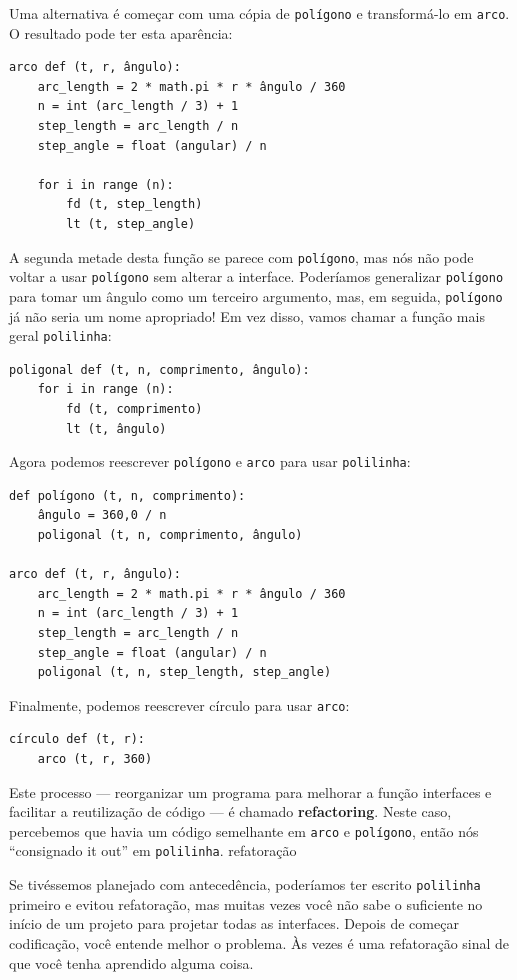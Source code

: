 \documentclass[10pt]{book}
\begin{document}
\begin{exercise}
Uma alternativa é começar com uma cópia
de {\tt polígono} e transformá-lo em {\tt arco}. O resultado
pode ter esta aparência:

\begin{verbatim}
arco def (t, r, ângulo):
    arc_length = 2 * math.pi * r * ângulo / 360
    n = int (arc_length / 3) + 1
    step_length = arc_length / n
    step_angle = float (angular) / n
    
    for i in range (n):
        fd (t, step_length)
        lt (t, step_angle)
\end{verbatim}
%
A segunda metade desta função se parece com {\tt polígono}, mas nós
não pode voltar a usar {\tt polígono} sem alterar a interface. Poderíamos
generalizar {\tt polígono} para tomar um ângulo como um terceiro argumento,
mas, em seguida, {\tt polígono} já não seria um nome apropriado!
Em vez disso, vamos chamar a função mais geral {\tt polilinha}:

\begin{verbatim}
poligonal def (t, n, comprimento, ângulo):
    for i in range (n):
        fd (t, comprimento)
        lt (t, ângulo)
\end{verbatim}
%
Agora podemos reescrever {\tt polígono} e {\tt arco} para usar {\tt polilinha}:

\begin{verbatim}
def polígono (t, n, comprimento):
    ângulo = 360,0 / n
    poligonal (t, n, comprimento, ângulo)

arco def (t, r, ângulo):
    arc_length = 2 * math.pi * r * ângulo / 360
    n = int (arc_length / 3) + 1
    step_length = arc_length / n
    step_angle = float (angular) / n
    poligonal (t, n, step_length, step_angle)
\end{verbatim}
%
Finalmente, podemos reescrever {círculo \tt} para usar {\tt arco}:

\begin{verbatim}
círculo def (t, r):
    arco (t, r, 360)
\end{verbatim}
%
Este processo --- reorganizar um programa para melhorar a função
interfaces e facilitar a reutilização de código --- é chamado {\bf refactoring}.
Neste caso, percebemos que havia um código semelhante em {\tt arco} e
{\tt polígono}, então nós ``consignado it out'' em {\tt polilinha}.
\index{} refatoração

Se tivéssemos planejado com antecedência, poderíamos ter escrito {\tt polilinha} primeiro
e evitou refatoração, mas muitas vezes você não sabe o suficiente no
início de um projeto para projetar todas as interfaces. Depois de começar
codificação, você entende melhor o problema. Às vezes é uma refatoração
sinal de que você tenha aprendido alguma coisa.



\end{exercise}
\end{document}
